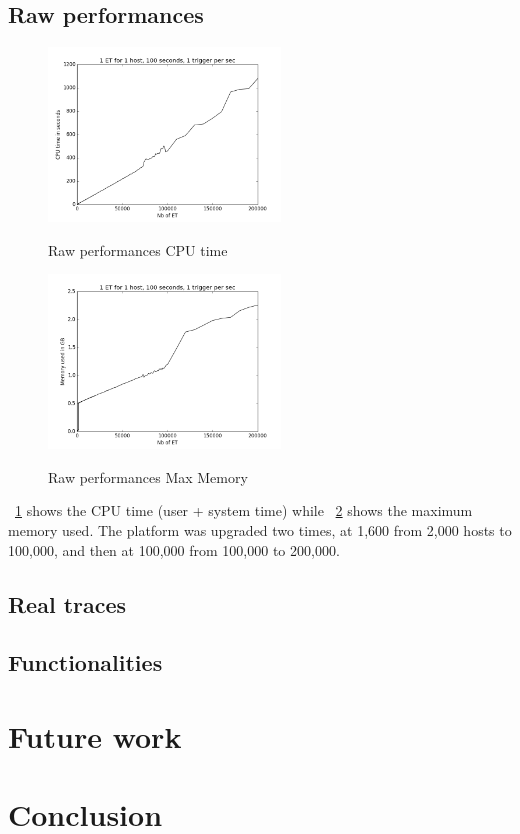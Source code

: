 \documentclass[a4paper]{IEEEtran}
\begin{document}
  \subsection{Raw performances}
    \begin{figure}
      \caption{Raw performances CPU time}
      \centering
      \includegraphics[width=0.55\textwidth]{../plots/raw_perf_time}
      \label{time_raw}
    \end{figure}
    \begin{figure}
      \caption{Raw performances Max Memory}
      \centering
      \includegraphics[width=0.55\textwidth]{../plots/raw_perf_mem}
      \label{mem_raw}
    \end{figure}
    
    \figurename~\ref{time_raw} shows the CPU time (user + system time) while 
    \figurename~\ref{mem_raw} shows the maximum memory used. The platform was
    upgraded two times, at 1,600 from 2,000 hosts to 100,000, and then at
    100,000 from 100,000 to 200,000.
    
    
  \subsection{Real traces}
  
  \subsection{Functionalities}
  

\section{Future work} \label{futurework}
  

\section{Conclusion} \label{conclu}





\end{document}
